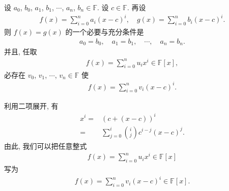 \begin{proposition}
    设 $a_0$, $b_0$, $a_1$, $b_1$, $\cdots$, $a_n$, $b_n \in \mathbb{F}$. 设 $c \in \mathbb{F}$. 再设
    \begin{align*}
        f(x) = \sum_{i = 0}^n a_i (x-c)^i, \quad g(x) = \sum_{i = 0}^n b_i (x-c)^i.
    \end{align*}
    则 $f(x)=g(x)$ 的一个必要与充分条件是
    \begin{align*}
        a_0 = b_0, \quad a_1 = b_1, \quad \cdots, \quad a_n = b_n.
    \end{align*}
    并且, 任取
    \begin{align*}
        f(x) = \sum_{i = 0}^n u_i x^i \in \mathbb{F}[x],
    \end{align*}
    必存在 $v_0$, $v_1$, $\cdots$, $v_n \in \mathbb{F}$ 使
    \begin{align*}
        f(x) = \sum_{i = 0}^n v_i (x-c)^i.
    \end{align*}
\end{proposition}

利用二项展开, 有
\begin{align*}
    x^i
    = {} & (c + (x - c))^i                                    \\
    = {} & \sum_{j = 0}^{i} \binom{i}{j} c^{i - j} (x-c)^{j}.
\end{align*}
由此, 我们可以把任意整式
\begin{align*}
    f(x) = \sum_{i = 0}^n u_i x^i \in \mathbb{F}[x]
\end{align*}
写为
\begin{align*}
    f(x) = \sum_{i = 0}^n v_i (x-c)^i \in \mathbb{F}[x].
\end{align*}

